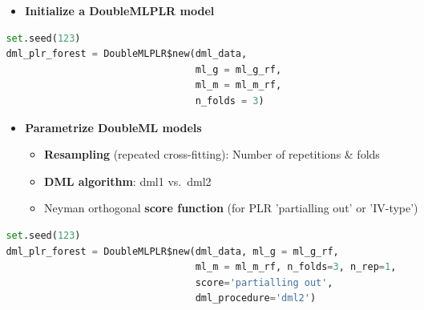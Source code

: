 \begin{frame}[fragile]
\begin{columns}
\begin{column}{0.3\textwidth}
\end{column}
\begin{column}{0.7\textwidth}
\begin{itemize}
\item \textbf{Initialize a DoubleMLPLR model}
\end{itemize}
{\tiny
\begin{lstlisting}[language=Python,
backgroundcolor = \color{gray!20},
keywordstyle=\color{OliveGreen}, stringstyle=\color{BrickRed}]
set.seed(123)
dml_plr_forest = DoubleMLPLR$new(dml_data,
                                 ml_g = ml_g_rf,
                                 ml_m = ml_m_rf,
                                 n_folds = 3)
\end{lstlisting}
}
\begin{itemize}
\item \textbf{Parametrize DoubleML models}
\begin{itemize}
\item \textbf{Resampling} (repeated cross-fitting): Number of repetitions \& folds
\item \textbf{DML algorithm}: dml1 vs.\ dml2
\item Neyman orthogonal \textbf{score function} (for PLR 'partialling out' or 'IV-type')
\end{itemize}
\end{itemize}
{\tiny
\begin{lstlisting}[language=Python,
backgroundcolor = \color{gray!20},
keywordstyle=\color{OliveGreen}, stringstyle=\color{BrickRed}]
set.seed(123)
dml_plr_forest = DoubleMLPLR$new(dml_data, ml_g = ml_g_rf,
                                 ml_m = ml_m_rf, n_folds=3, n_rep=1,
                                 score='partialling out',
                                 dml_procedure='dml2')
\end{lstlisting}
}
\end{column}
\end{columns}
\end{frame}

